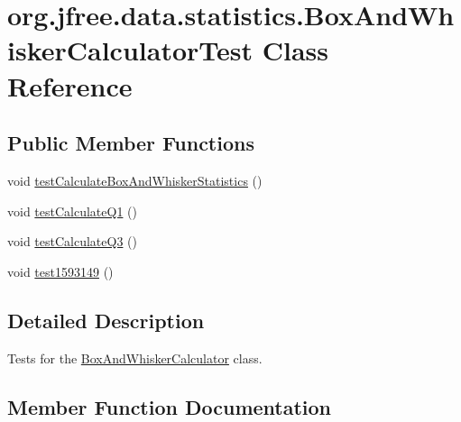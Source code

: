\hypertarget{classorg_1_1jfree_1_1data_1_1statistics_1_1_box_and_whisker_calculator_test}{}\section{org.\+jfree.\+data.\+statistics.\+Box\+And\+Whisker\+Calculator\+Test Class Reference}
\label{classorg_1_1jfree_1_1data_1_1statistics_1_1_box_and_whisker_calculator_test}
\subsection*{Public Member Functions}
\begin{DoxyCompactItemize}
\item 
void \mbox{\hyperlink{classorg_1_1jfree_1_1data_1_1statistics_1_1_box_and_whisker_calculator_test_adf24ce9c6faa1442b1b64fbff0e42fe9}{test\+Calculate\+Box\+And\+Whisker\+Statistics}} ()
\item 
void \mbox{\hyperlink{classorg_1_1jfree_1_1data_1_1statistics_1_1_box_and_whisker_calculator_test_a7a2861ec5a9c33d062ec36f3717b2753}{test\+Calculate\+Q1}} ()
\item 
void \mbox{\hyperlink{classorg_1_1jfree_1_1data_1_1statistics_1_1_box_and_whisker_calculator_test_afbb342f3101188b1703470971e86a8c3}{test\+Calculate\+Q3}} ()
\item 
void \mbox{\hyperlink{classorg_1_1jfree_1_1data_1_1statistics_1_1_box_and_whisker_calculator_test_a3fc29d921292b90af6634e10bb200aaf}{test1593149}} ()
\end{DoxyCompactItemize}


\subsection{Detailed Description}
Tests for the \mbox{\hyperlink{classorg_1_1jfree_1_1data_1_1statistics_1_1_box_and_whisker_calculator}{Box\+And\+Whisker\+Calculator}} class. 

\subsection{Member Function Documentation}
\mbox{\label{classorg_1_1jfree_1_1data_1_1statistics_1_1_box_and_whisker_calculator_test_a3fc29d921292b90af6634e10bb200aaf}} 
